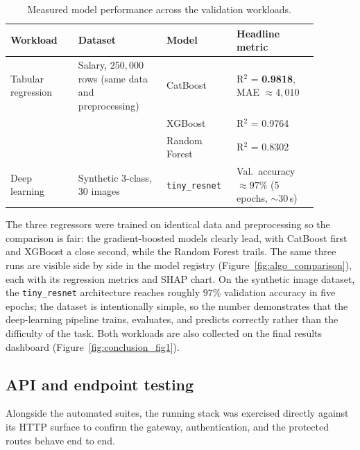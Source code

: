 \documentclass[12pt, a4paper, oneside]{report}
\begin{document}
\begin{table}[H]
\centering
\caption{Measured model performance across the validation workloads.}
\label{tab:model_performance}
\begin{tabular}{|L{0.20\linewidth}|L{0.26\linewidth}|L{0.18\linewidth}|L{0.24\linewidth}|}
\hline
\textbf{Workload} & \textbf{Dataset} & \textbf{Model} & \textbf{Headline metric} \\
\hline
Tabular regression & Salary, $250{,}000$ rows (same data and preprocessing) & CatBoost & R$^2$ = \textbf{0.9818}, MAE $\approx 4{,}010$ \\ \hline
                   &  & XGBoost & R$^2$ = 0.9764 \\ \hline
                   &  & Random Forest & R$^2$ = 0.8302 \\ \hline
Deep learning      & Synthetic 3-class, 30 images & \texttt{tiny\_resnet} & Val.\ accuracy $\approx 97\%$ (5 epochs, $\sim$30\,s) \\
\hline
\end{tabular}
\end{table}

The three regressors were trained on identical data and preprocessing
so the comparison is fair: the gradient-boosted models clearly lead,
with CatBoost first and XGBoost a close second, while the Random Forest
trails. The same three runs are visible side by side in the model
registry (Figure~\ref{fig:algo_comparison}), each with its regression
metrics and SHAP chart. On the synthetic image dataset, the
\texttt{tiny\_resnet} architecture reaches roughly $97\%$ validation
accuracy in five epochs; the dataset is intentionally simple, so the
number demonstrates that the deep-learning pipeline trains, evaluates,
and predicts correctly rather than the difficulty of the task. Both
workloads are also collected on the final results dashboard
(Figure~\ref{fig:conclusion_fig1}).

\subsection{API and endpoint testing}

Alongside the automated suites, the running stack was exercised
directly against its HTTP surface to confirm the gateway, authentication,
and the protected routes behave end to end.
\end{document}
